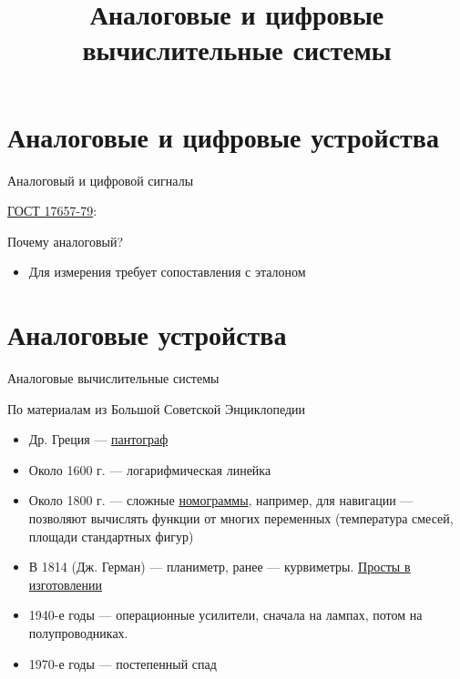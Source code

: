 \documentclass[xetex,aspectratio=43]{beamer}
\title[Аналоговые и цифровые ВС]{Аналоговые и цифровые вычислительные системы}
\begin{document}
\titleslide

\tocslide

\section{Аналоговые и цифровые устройства}

\begin{frame}{Аналоговый и цифровой сигналы}

	\href{http://protect.gost.ru/v.aspx?control=7\&id=152608}{ГОСТ 17657-79}:



	\pause

	Почему аналоговый?

	\begin{itemize}
		\item Для измерения требует сопоставления с эталоном
	\end{itemize}
\end{frame}

\section{Аналоговые устройства}

\begin{frame}{Аналоговые вычислительные системы}

	\pause

	По материалам из Большой Советской Энциклопедии

	\begin{itemize}

		\item
		Др. Греция ---
		\href{https://ru.wikipedia.org/wiki/\%D0\%9F\%D0\%B0\%D0\%BD\%D1\%82\%D0\%BE\%D0\%B3\%D1\%80\%D0\%B0\%D1\%84_(\%D0\%BF\%D1\%80\%D0\%B8\%D0\%B1\%D0\%BE\%D1\%80)\#\%D0\%98\%D0\%B7\%D0\%BE\%D0\%B1\%D1\%80\%D0\%B0\%D0\%B6\%D0\%B5\%D0\%BD\%D0\%B8\%D1\%8F}{пантограф}
		\item
		Около 1600 г. --- логарифмическая линейка
		\item
		Около 1800 г. --- сложные
		\href{https://en.wikipedia.org/wiki/Nomogram}{номограммы}, например,
		для навигации --- позволяют вычислять функции от многих переменных
		(температура смесей, площади стандартных фигур)
		\item
		В 1814 (Дж. Герман) --- планиметр, ранее --- курвиметры.
		\href{\ytlink{kwSN7edZZnM}}{Просты в изготовлении}
		\item
		1940-е годы --- операционные усилители, сначала на лампах, потом на
		полупроводниках.
		\item
		1970-е годы --- постепенный спад
	\end{itemize}
\end{frame}
\end{document}
